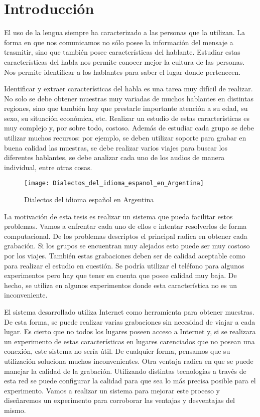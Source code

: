 
\chapter{Introducción}


El uso de la lengua siempre ha caracterizado a las personas que la utilizan. La forma en que nos comunicamos no sólo posee la información del mensaje a trasmitir, sino que también posee características del hablante. Estudiar estas características del habla nos permite conocer mejor la cultura de las personas. Nos permite identificar a los hablantes para saber el lugar donde pertenecen.

Identificar y extraer características del habla es una tarea muy difícil de realizar. No solo se debe obtener muestras muy variadas de muchos hablantes en distintas regiones, sino que también hay que prestarle importante atención a su edad, su sexo, su situación económica, etc. Realizar un estudio de estas características es muy complejo y, por sobre todo, costoso. Además de estudiar cada grupo se debe utilizar muchos recursos: por ejemplo, se deben utilizar soporte para grabar en buena calidad las muestras, se debe realizar varios viajes para buscar los diferentes hablantes, se debe analizar cada uno de los audios de manera individual, entre otras cosas. 

\begin{figure}[h!]
	\centering
    \texttt{[image: Dialectos\_del\_idioma\_espanol\_en\_Argentina]} 
    \caption{Dialectos del idioma español en Argentina}
    \label{fig11}
\end{figure}

La motivación de esta tesis es realizar un sistema que pueda facilitar estos problemas. Vamos a enfrentar cada uno de ellos e intentar resolverlos de forma computacional. De los problemas descriptos el principal radica en obtener cada grabación. Si los grupos se encuentran muy alejados esto puede ser muy costoso por los viajes. También estas grabaciones deben ser de calidad aceptable como para realizar el estudio en cuestión. Se podría utilizar el teléfono para algunos experimentos pero hay que tener en cuenta que posee calidad muy baja. De hecho, se utiliza en algunos experimentos donde esta característica no es un inconveniente. 

El sistema desarrollado utiliza Internet como herramienta para obtener muestras. De esta forma, se puede realizar varias grabaciones sin necesidad de viajar a cada lugar. Es cierto que no todos los lugares poseen acceso a Internet y, si se realizara un experimento de estas características en lugares carenciados que no posean una conexión, este sistema no sería útil. De cualquier forma, pensamos que su utilización soluciona muchos inconvenientes. Otra ventaja radica en que se puede manejar la calidad de la grabación. Utilizando distintas tecnologías a través de esta red se puede configurar la calidad para que sea lo más precisa posible para el experimento. Vamos a realizar un sistema para mejorar este proceso y diseñaremos un experimento para corroborar las ventajas y desventajas del mismo.

